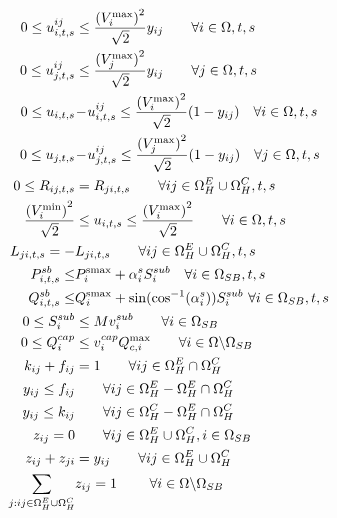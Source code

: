 \documentclass[journal]{IEEEtran}
\theoremstyle{remark}
\begin{document}
\begin{subequations}
\begin{align}
0 \le u_{i,t,s}^{ij}& \le \frac{{{{(V_i^{\max })}^2}}}{{\sqrt 2 }}{y_{ij}}  \qquad\forall i \in \Omega ,t,s  \label{eq_a7}\\
0 \le u_{j,t,s}^{ij}& \le \frac{{{{(V_j^{\max })}^2}}}{{\sqrt 2 }}{y_{ij}}  \qquad\forall j \in \Omega ,t,s  \label{eq_a8}\\
0 \le {u_{i,t,s}}&\!-\!u_{i,t,s}^{ij} \le \frac{{{{(V_i^{\max })}^2}}}{{\sqrt 2 }}(1 - {y_{ij}})  \quad\forall i \in \Omega ,t,s  \label{eq_a9}\\
0 \le{u_{j,t,s}} &\!-\!u_{j,t,s}^{ij} \le \frac{{{{(V_j^{\max })}^2}}}{{\sqrt 2 }}(1 - {y_{ij}}) \quad\forall j \in \Omega ,t,s \label{eq_a10}\\
0 \le{R_{ij,t,s}}& = {R_{ji,t,s}}  \qquad\forall ij \in \Omega _H^E \cup \Omega _H^C,t,s \label{eq_a11}\\
\frac{{{{(V_i^{\min })}^2}}}{{\sqrt 2 }} &\le{u_{i,t,s}} \le \frac{{{{(V_i^{\max })}^2}}}{{\sqrt 2 }} \qquad\forall i \in \Omega ,t,s  \label{eq_a12}\\
{L_{ji,t,s}} =  - &{L_{ji,t,s}}  \qquad\forall ij \in \Omega _H^E \cup \Omega _H^C,t,s \label{eq_a13}\\
P_{i,t,s}^{sb} \le & P_i^{{\rm{smax}}} + \alpha_i^sS_i^{sub} \quad\forall i \in {\Omega_{SB}},t,s  \label{eq_a14}\\
Q_{i,t,s}^{sb} \le & Q_i^{{\rm{smax}}} +\sin(\cos^{-1}(\alpha_i^s))S_i^{sub} \ \forall i \in {\Omega_{SB}},t,s \label{eq_a15}\\
0 \le S_i^{sub} & \le Mv_i^{sub}   \qquad\forall i \in {\Omega_{SB}}   \label{eq_a16}\\
0 \le Q_i^{cap} & \le v_i^{cap}Q_{c,i}^{\max }   \qquad\forall i \in \Omega \backslash {\Omega _{SB}}                \label{eq_a17}\\
{k_{ij}} + {f_{ij}} & = 1      \qquad\forall ij \in \Omega _H^E \cap \Omega _H^C            \label{eq_a18}\\
{y_{ij}} \le {f_{ij}} &        \qquad\forall ij \in \Omega _H^E - \Omega _H^E \cap \Omega _H^C         \label{eq_a19}\\
{y_{ij}} \le {k_{ij}} &       \qquad\forall ij \in \Omega _H^C - \Omega _H^E \cap \Omega _H^C      \label{eq_a20}\\
{z_{ij}} = 0 &         \qquad\forall ij \in \Omega _H^E \cup \Omega _H^C,i \in {\Omega _{SB}}         \label{eq_a21}\\
{z_{ij}} + {z_{ji}} & = {y_{ij}}      \qquad\forall ij \in \Omega _H^E \cup \Omega _H^C            \label{eq_a22}\\
\sum_{j: ij \in \Omega _H^E \cup \Omega _H^C}&{{z_{ij}}}   = 1   \,\,\qquad\forall i \in \Omega \backslash {\Omega _{SB}} \label{eq_a23}\\

\end{align}
\end{subequations}
\end{document}
